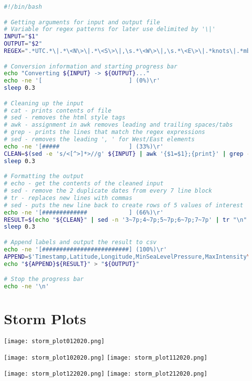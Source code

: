 \documentclass[]{article}
\begin{document}
\begin{lstlisting}[language=Bash, caption=CSV Script]
#!/bin/bash

# Getting arguments for input and output file
# Variable for regex patterns for later use delimited by '\|'
INPUT="$1"
OUTPUT="$2"
REGEX=".*UTC.*\|.*\<N\>\|.*\<S\>\|,\s.*\<W\>\|,\s.*\<E\>\|.*knots\|.*mb"

# Conversion information and starting progress bar
echo "Converting ${INPUT} -> ${OUTPUT}..."
echo -ne '[                         ] (0%)\r'
sleep 0.3

# Cleaning up the input
# cat - prints contents of file
# sed - removes the html style tags
# awk - assignment in awk removes leading and trailing spaces/tabs
# grep - prints the lines that match the regex expressions
# sed - removes the leading ', ' for West/East elements
echo -ne '[#####                    ] (33%)\r'
CLEAN=$(sed -e 's/<[^>]*>//g' ${INPUT} | awk '{$1=$1};{print}' | grep -o ${REGEX} | sed -e 's/, //g')
sleep 0.3

# Formatting the output
# echo - get the contents of the cleaned input
# sed - remove the 2 duplicate dates from every 7 line block
# tr - replaces new lines with commas
# sed - puts the new line back to create rows of 5 values of interest
echo -ne '[#############            ] (66%)\r'
RESULT=$(echo "${CLEAN}" | sed -n '3~7p;4~7p;5~7p;6~7p;7~7p' | tr "\n" "," | sed 's/,/\n/5;P;D')
sleep 0.3

# Append labels and output the result to csv
echo -ne '[#########################] (100%)\r'
APPEND=$'Timestamp,Latitude,Longitude,MinSeaLevelPressure,MaxIntensity\n'
echo "${APPEND}${RESULT}" > "${OUTPUT}"

# Stop the progress bar
echo -ne '\n'
\end{lstlisting}

\section{Storm Plots}

\texttt{[image: storm\_plot012020.png]}

\texttt{[image: storm\_plot102020.png]}
\bigbreak \bigbreak
\texttt{[image: storm\_plot112020.png]}

\texttt{[image: storm\_plot122020.png]}
\bigbreak \bigbreak
\texttt{[image: storm\_plot212020.png]}
\end{document}

